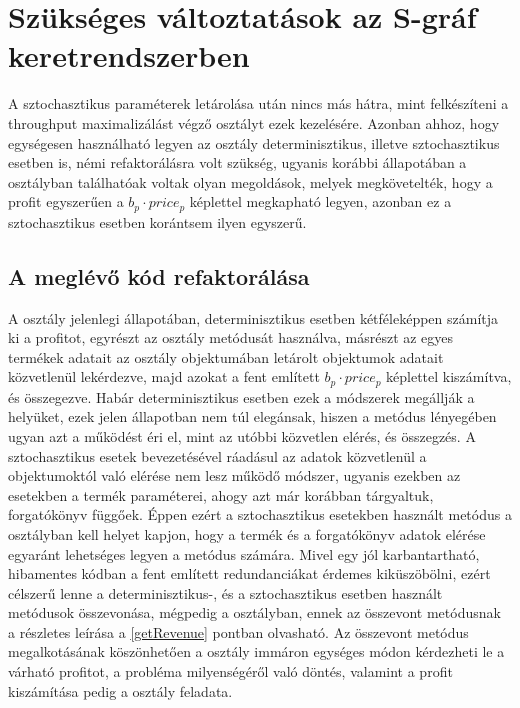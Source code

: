 \section{Szükséges változtatások az S-gráf keretrendszerben} \label{refactor}
A sztochasztikus paraméterek letárolása után nincs más hátra, mint felkészíteni a throughput maximalizálást végző  osztályt ezek kezelésére.
Azonban ahhoz, hogy egységesen használható legyen az osztály determinisztikus, illetve sztochasztikus esetben is, némi refaktorálásra volt szükség, ugyanis korábbi állapotában a  osztályban találhatóak voltak olyan megoldások, melyek megkövetelték, hogy a profit egyszerűen a $b_p\cdot price_p$ képlettel megkapható legyen, azonban ez a sztochasztikus esetben korántsem ilyen egyszerű.
\subsection{A meglévő kód refaktorálása}
A  osztály jelenlegi állapotában, determinisztikus esetben kétféleképpen számítja ki a profitot, egyrészt az  osztály  metódusát használva, másrészt az egyes termékek adatait az  osztály  objektumában letárolt  objektumok adatait közvetlenül lekérdezve, majd azokat a fent említett $b_p\cdot price_p$ képlettel kiszámítva, és összegezve.
Habár determinisztikus esetben ezek a módszerek megállják a helyüket, ezek jelen állapotban nem túl elegánsak, hiszen a  metódus lényegében ugyan azt a működést éri el, mint az utóbbi közvetlen elérés, és összegzés.
A sztochasztikus esetek bevezetésével ráadásul az adatok közvetlenül a  objektumoktól való elérése nem lesz működő módszer, ugyanis ezekben az esetekben a termék paraméterei, ahogy azt már korábban tárgyaltuk, forgatókönyv függőek.
Éppen ezért a sztochasztikus esetekben használt  metódus a  osztályban kell helyet kapjon, hogy a termék és a forgatókönyv adatok elérése egyaránt lehetséges legyen a metódus számára.
Mivel egy jól karbantartható, hibamentes kódban a fent említett redundanciákat érdemes kiküszöbölni, ezért célszerű lenne a determinisztikus-, és a sztochasztikus esetben használt  metódusok összevonása, mégpedig a  osztályban, ennek az összevont metódusnak a részletes leírása a \ref{getRevenue} pontban olvasható.
Az összevont  metódus megalkotásának köszönhetően a  osztály immáron egységes módon kérdezheti le a várható profitot, a probléma milyenségéről való döntés, valamint a profit kiszámítása pedig a  osztály feladata.
